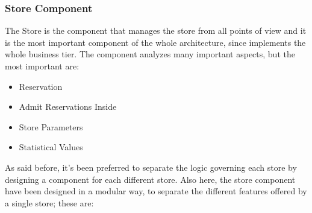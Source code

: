 \documentclass{article}
\begin{document}
		\subsubsection{Store Component}
			The Store is the component that manages the store from all points of view and it is the most important component of the whole architecture, since implements the whole business tier. The component analyzes many important aspects, but the most important are:
			
			\begin{itemize}
				\item Reservation
				\item Admit Reservations Inside
				\item Store Parameters
				\item Statistical Values
			\end{itemize}
		
			As said before, it’s been preferred to separate the logic governing each store by designing a component for each different store. Also here, the store component have been designed in a modular way, to separate the different features offered by a single store; these are:
			
\end{document}
